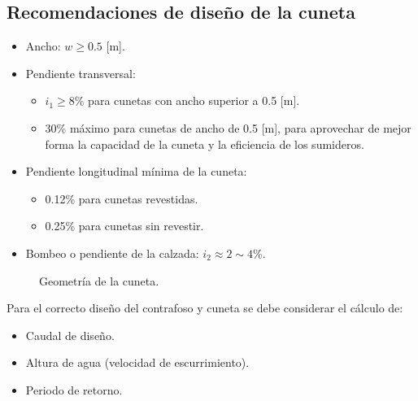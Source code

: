\subsection{Recomendaciones de diseño de la cuneta}
\begin{itemize}
  \item Ancho: $w\geq0.5$ [m].
  \item Pendiente transversal:
  \begin{itemize}
    \item $i_1\geq8\%$ para cunetas con ancho superior a 0.5 [m].
    \item 30\% máximo para cunetas de ancho de 0.5 [m], para aprovechar de
          mejor forma la capacidad de la cuneta y la eficiencia de los sumideros.
  \end{itemize}
  \item Pendiente longitudinal mínima de la cuneta:
  \begin{itemize}
    \item 0.12\% para cunetas revestidas.
    \item 0.25\% para cunetas sin revestir.
  \end{itemize}
  \item Bombeo o pendiente de la calzada: $i_2\approx2\sim4\%$.
\end{itemize}

\begin{figure}[H]
\centering
{}
\caption{Geometría de la cuneta.}
\end{figure}

Para el correcto diseño del contrafoso y cuneta se debe considerar el cálculo de:
\begin{itemize}
  \item Caudal de diseño.
  \item Altura de agua (velocidad de escurrimiento).
  \item Periodo de retorno.
\end{itemize}

